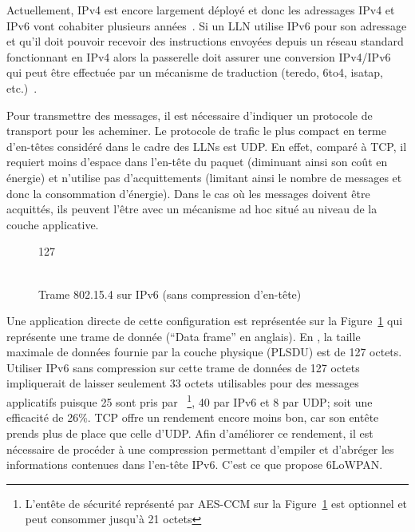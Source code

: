 Actuellement, IPv4 est encore largement déployé et donc les adressages IPv4 et IPv6 vont cohabiter plusieurs années~\cite{colitti2010evaluating}.
Si un \ac{LLN} utilise IPv6 pour son adressage et qu'il doit pouvoir recevoir des instructions envoyées depuis un réseau standard fonctionnant en IPv4 alors la passerelle doit assurer une conversion IPv4/IPv6 qui peut être effectuée par un mécanisme de traduction (teredo, 6to4, isatap, etc.)~\cite{conta1998generic}.

Pour transmettre des messages, il est nécessaire d'indiquer un protocole de transport pour les acheminer.
Le protocole de trafic le plus compact en terme d'en-têtes considéré dans le cadre des \ac{LLN}s est \ac{UDP}.
En effet, comparé à \ac{TCP}, il requiert moins d'espace dans l'en-tête du paquet (diminuant ainsi son coût en énergie) et n'utilise pas d'acquittements (limitant ainsi le nombre de messages et donc la consommation d'énergie).
Dans le cas où les messages doivent être acquittés, ils peuvent l'être avec un mécanisme ad hoc situé au niveau de la couche applicative.

\begin{figure}[ht]
	\centering
	\begin{bytefield}[bitwidth=.007\linewidth]{127}
		 \\
		\\
		\end{bytefield}
	\caption{Trame 802.15.4 sur IPv6 (sans compression d'en-tête)}
	\label{gw:fig:802154}
\end{figure}

Une application directe de cette configuration est représentée sur la Figure~\ref{gw:fig:802154} qui représente une trame \ieee{} de donnée (``Data frame'' en anglais).
En \ieee{}, la taille maximale de données fournie par la couche physique (\ac{PLSDU}) est de 127 octets.
Utiliser IPv6 sans compression sur cette trame de données de 127 octets impliquerait de laisser seulement 33 octets utilisables pour des messages applicatifs puisque 25 sont pris par \ieee{}~\footnote{L'entête de sécurité représenté par AES-CCM sur la Figure~\ref{gw:fig:802154} est optionnel et peut consommer jusqu'à 21 octets}, 40 par IPv6 et 8 par \ac{UDP}; soit une efficacité de 26\%.
\ac{TCP} offre un rendement encore moins bon, car son entête prends plus de place que celle d'\ac{UDP}.
Afin d'améliorer ce rendement, il est nécessaire de procéder à une compression permettant d'empiler et d'abréger les informations contenues dans l'en-tête IPv6.
C'est ce que propose \ac{6LoWPAN}.

